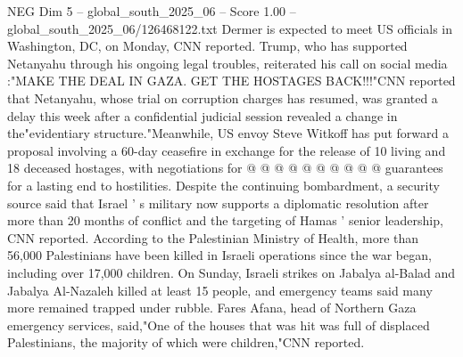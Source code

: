 \begin{textsample}{NEG Dim 5 – global\_south\_2025\_06 – Score 1.00 – global\_south\_2025\_06/126468122.txt}
Dermer is expected to meet US officials in Washington, DC, on Monday, CNN reported.
Trump, who has supported Netanyahu through his ongoing legal troubles, reiterated his call on social media :"MAKE THE DEAL IN GAZA.
GET THE HOSTAGES BACK!!!"CNN reported that Netanyahu, whose trial on corruption charges has resumed, was granted a delay this week after a confidential judicial session revealed a change in the"evidentiary structure."Meanwhile, US envoy Steve Witkoff has put forward a proposal involving a 60-day ceasefire in exchange for the release of 10 living and 18 deceased hostages, with negotiations for @ @ @ @ @ @ @ @ @ @ guarantees for a lasting end to hostilities.
Despite the continuing bombardment, a security source said that Israel ' s military now supports a diplomatic resolution after more than 20 months of conflict and the targeting of Hamas ' senior leadership, CNN reported.
According to the Palestinian Ministry of Health, more than 56,000 Palestinians have been killed in Israeli operations since the war began, including over 17,000 children.
On Sunday, Israeli strikes on Jabalya al-Balad and Jabalya Al-Nazaleh killed at least 15 people, and emergency teams said many more remained trapped under rubble.
Fares Afana, head of Northern Gaza emergency services, said,"One of the houses that was hit was full of displaced Palestinians, the majority of which were children,"CNN reported.

\end{textsample}
